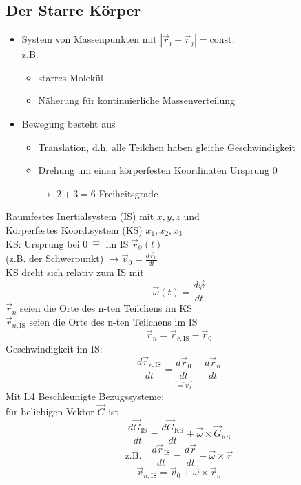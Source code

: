 \documentclass[titlepage,12pt,a4paper,ngerman]{report}
\newcommand{\tx}[1]{\textrm{#1}}
\newcommand{\ub}[1]{\underbrace{#1}}
\begin{document}
\subsection{Der Starre Körper}
\begin{itemize}
	\item System von Massenpunkten mit $ |\vec{r}_i - \vec{r}_j | = \tx{const.} $\\
	z.B.
	\begin{itemize}
		\item starres Molekül
		\item Näherung für kontinuierliche Massenverteilung
	\end{itemize}
	\item Bewegung besteht aus
	\begin{itemize}
		\item Translation, d.h. alle Teilchen haben gleiche Geschwindigkeit
		\item Drehung um einen körperfesten Koordinaten Ursprung $ 0 $
		\item[$ \rightarrow $] $ 2+3=6 $ Freiheitsgrade
	\end{itemize}
\end{itemize}
Raumfestes Inertialsystem (IS) mit $ x,y,z $ und \\
Körperfestes Koord.system (KS) $ x_1,x_2,x_3 $\\
KS: Ursprung bei $ 0 \ \widehat{=} $ im IS $ \vec{r}_0(t) $\\
(z.B. der Schwerpunkt) $ \rightarrow \vec{v}_0 = \frac{d\vec{r}_0}{dt} $\\
KS dreht sich relativ zum IS mit
$$ \vec{\omega}(t) = \frac{d\vec{\varphi}}{dt}$$
$ \vec{r}_n $ seien die Orte des n-ten Teilchens im KS\\
$ \vec{r}_{n,\tx{IS}} $ seien die Orte des n-ten Teilchens im IS
$$ \vec{r}_n = \vec{r}_{r,\tx{IS}} - \vec{r}_0$$
Geschwindigkeit im IS:
$$ \frac{d \vec{r}_{r,\tx{IS}}}{dt} = \ub{\frac{ d \vec{r}_0}{dt}}_{= v_0} + \frac{d\vec{r}_n}{dt}$$
Mit I.4 Beschleunigte Bezugssysteme: \\
für beliebigen Vektor $ \vec{G} $ ist
\begin{equation}
\frac{d\vec{G}_{\tx{IS}}}{dt} = \frac{d \vec{G}_{\tx{KS}}}{dt} + \vec{\omega} \times \vec{G}_{\tx{KS}} \tag{$*$}
\end{equation}
$$ \tx{z.B.} \quad \frac{d \vec{r}_{\tx{IS}}}{dt} = \frac{d \vec{r}}{dt} + \vec{\omega} \times \vec{r}$$
\begin{equation}
\vec{v}_{n,\tx{IS}} = \vec{v}_0 + \vec{\omega}\times \vec{r}_n \tag{1}
\end{equation}
\end{document}
